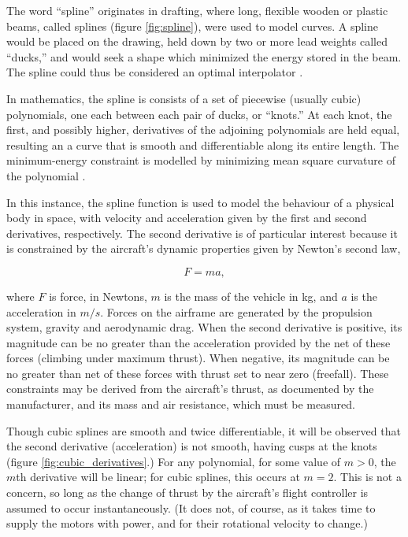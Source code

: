 \documentclass[doc]{apa6}
\begin{document}
The word ``spline'' originates in drafting, where long, flexible wooden or plastic beams, called splines (figure \ref{fig:spline}), were used to model curves. A spline would be placed on the drawing, held down by two or more lead weights called ``ducks,'' and would seek a shape which minimized the energy stored in the beam. The spline could thus be considered an optimal interpolator \parencite{Wegman2016}. 

In mathematics, the spline is consists of a set of piecewise (usually cubic) polynomials, one each between each pair of ducks, or ``knots.'' At each knot, the first, and possibly higher, derivatives of the adjoining polynomials are held equal, resulting an a curve that is smooth and differentiable along its entire length. The minimum-energy constraint is modelled by minimizing mean square curvature of the polynomial \parencite{Wegman2016}.

In this instance, the spline function is used to model the behaviour of a physical body in space, with velocity and acceleration given by the first and second derivatives, respectively. The second derivative is of particular interest because it is constrained by the aircraft's dynamic properties given by Newton's second law,

\begin{equation}
F = ma,
\end{equation} 

where $F$ is force, in Newtons, $m$ is the mass of the vehicle in kg, and $a$ is the acceleration in $m/s$. Forces on the airframe are generated by the propulsion system, gravity and aerodynamic drag. When the second derivative is positive, its magnitude can be no greater than the acceleration provided by the net of these forces (climbing under maximum thrust). When negative, its magnitude can be no greater than net of these forces with thrust set to near zero (freefall). These constraints may be derived from the aircraft's thrust, as documented by the manufacturer, and its mass and air resistance, which must be measured. 

Though cubic splines are smooth and twice differentiable, it will be observed that the second derivative (acceleration) is not smooth, having cusps at the knots (figure \ref{fig:cubic_derivatives}.) For any polynomial, for some value of $m > 0$, the $m$th derivative will be linear; for cubic splines, this occurs at $m = 2$. This is not a concern, so long as the change of thrust by the aircraft's flight controller is assumed to occur instantaneously. (It does not, of course, as it takes time to supply the motors with power, and for their rotational velocity to change.) 
\end{document}
